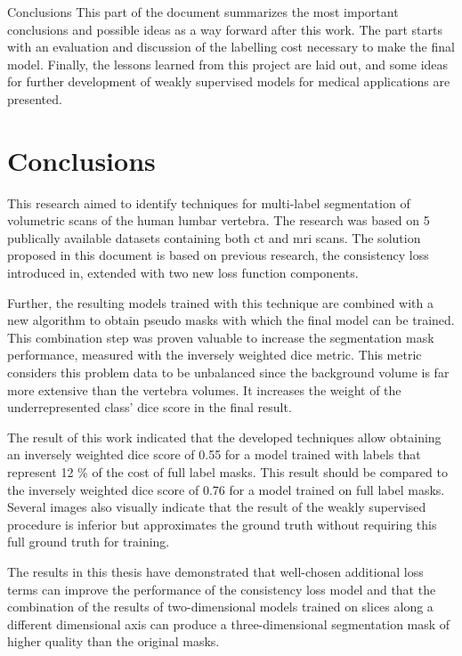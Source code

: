 \begin{partwithabstract}{Conclusions}
    This part of the document summarizes the most important conclusions and possible ideas as a way forward after this work.
    The part starts with an evaluation and discussion of the labelling cost necessary to make the final model. 
    Finally, the lessons learned from this project are laid out, and some ideas for further development of weakly supervised models for medical applications are presented. 
\end{partwithabstract}
\restoregeometry

\chapter{Conclusions}\thispagestyle{empty}
\par{
    This research aimed to identify techniques for multi-label segmentation of volumetric scans of the human lumbar vertebra.
    The research was based on 5 publically available datasets containing both \acrshort{ct} and \acrshort{mri} scans.
    The solution proposed in this document is based on previous research, the consistency loss introduced in\cite{Laradji2021}, extended with two new loss function components.  
}
\par{
    Further, the resulting models trained with this technique are combined with a new algorithm to obtain pseudo masks with which the final model can be trained.
    This combination step was proven valuable to increase the segmentation mask performance, measured with the inversely weighted dice metric.
    This metric considers this problem data to be unbalanced since the background volume is far more extensive than the vertebra volumes. 
    It increases the weight of the underrepresented class' dice score in the final result.
}
\par{
    The result of this work indicated that the developed techniques allow obtaining an inversely weighted dice score of 0.55 for a model trained with labels that represent 12 \% of the cost of full label masks.
    This result should be compared to the inversely weighted dice score of 0.76 for a model trained on full label masks.
    Several images also visually indicate that the result of the weakly supervised procedure is inferior but approximates the ground truth without requiring this full ground truth for training.
}
\par{
    The results in this thesis have demonstrated that well-chosen additional loss terms can improve the performance of the consistency loss model and that the combination of the results of two-dimensional models trained on slices along a different dimensional axis can produce a three-dimensional segmentation mask of higher quality than the original masks.
}

